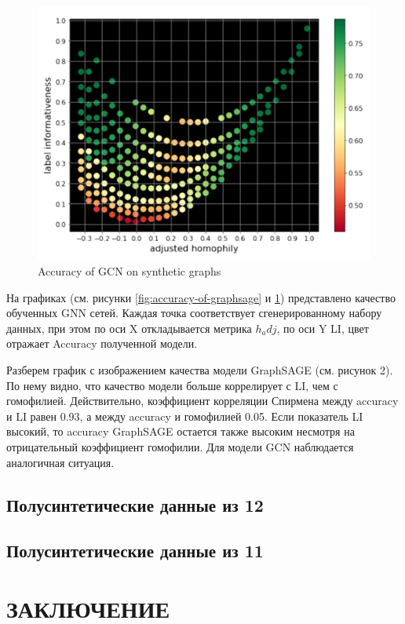 \documentclass[a4paper,14pt]{article}
\begin{document}
	\begin{figure}[H]
		\centering
		\includegraphics[width=0.4\linewidth]{"images/Accuracy of GCN"}
		\caption{Accuracy of GCN on synthetic graphs}
		\label{fig:accuracy-of-gcn}
	\end{figure}

	На графиках (см. рисунки \ref{fig:accuracy-of-graphsage} и \ref{fig:accuracy-of-gcn}) представлено качество обученных GNN сетей.
	Каждая точка соответствует сгенерированному набору данных, при этом по оси X откладывается метрика $h_adj$, по оси Y LI, цвет отражает Accuracy полученной модели. 
	
	Разберем график с изображением качества модели GraphSAGE (см. рисунок 2).
	По нему видно, что качество модели больше коррелирует с LI, чем с гомофилией. Действительно, коэффициент корреляции Спирмена между accuracy и LI равен 0.93, а между accuracy и гомофилией 0.05.
	Если показатель LI высокий, то accuracy GraphSAGE остается также высоким несмотря на отрицательный коэффициент гомофилии. Для модели GCN наблюдается аналогичная ситуация.

	
	
	\subsection{Полусинтетические данные из 12}
	
	\subsection{Полусинтетические данные из 11}
	
	\pagebreak
	
	\section*{ \hfill ЗАКЛЮЧЕНИЕ \hfill}
	
    \pagebreak
    \renewcommand{\refname}{{ \hfill СПИСОК ИСПОЛЬЗОВАННЫХ ИСТОЧНИКОВ \hfill}}
%    
    
    
    \newpage
\end{document}
